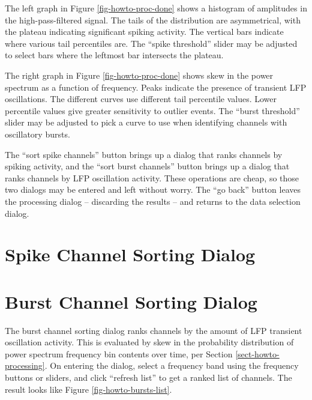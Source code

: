 The left graph in Figure \ref{fig-howto-proc-done} shows a histogram of
amplitudes in the high-pass-filtered signal. The tails of the distribution
are asymmetrical, with the plateau indicating significant spiking activity.
The vertical bars indicate where various tail percentiles are. The ``spike
threshold'' slider may be adjusted to select bars where the leftmost bar
intersects the plateau.

The right graph in Figure \ref{fig-howto-proc-done} shows skew in the power
spectrum as a function of frequency. Peaks indicate the presence of
transient LFP oscillations. The different curves use different tail percentile
values. Lower percentile values give greater sensitivity to outlier events.
The ``burst threshold'' slider may be adjusted to pick a curve to use when
identifying channels with oscillatory bursts.

The ``sort spike channels'' button brings up a dialog that ranks channels
by spiking activity, and the ``sort burst channels'' button brings up a
dialog that ranks channels by LFP oscillation activity. These operations are
cheap, so those two dialogs may be entered and left without worry. The
``go back'' button leaves the processing dialog -- discarding the results --
and returns to the data selection dialog.

%
%
\section{Spike Channel Sorting Dialog}
\label{sect-howto-spikes}


%
%
\section{Burst Channel Sorting Dialog}
\label{sect-howto-bursts}

The burst channel sorting dialog ranks channels by the amount of LFP
transient oscillation activity. This is evaluated by skew in the probability
distribution of power spectrum frequency bin contents over time, per
Section \ref{sect-howto-processing}. On entering the dialog, select a
frequency band using the frequency buttons or sliders, and click ``refresh
list'' to get a ranked list of channels. The result looks like Figure
\ref{fig-howto-bursts-list}.

